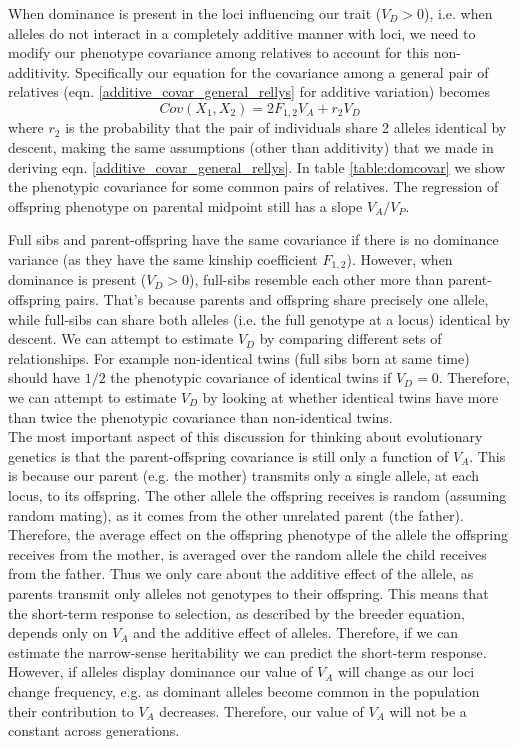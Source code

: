 When dominance is present in the loci influencing our trait ($V_D>0$), i.e. when alleles do not interact
in a completely additive manner with loci, we need to modify our
phenotype covariance among relatives to account for this
non-additivity. Specifically our equation for the covariance among a
general pair of relatives
(eqn. \ref{additive_covar_general_rellys} for additive variation) becomes
\begin{equation}
 Cov(X_1,X_2) = 2 F_{1,2} V_A + r_2 V_D
\end{equation}
where $r_2$ is the probability that the pair of individuals share 2
alleles identical by descent, making the same assumptions (other than additivity) that we made in deriving
eqn. \ref{additive_covar_general_rellys}.  In table
\ref{table:domcovar} we show the phenotypic covariance for some common
pairs of relatives. The regression of offspring phenotype on parental
midpoint still has a slope $V_A/V_P$. 

Full sibs and parent-offspring have the same
covariance if there is no dominance variance (as they have the same
kinship coefficient $F_{1,2}$). However, when dominance
is present ($V_D>0$), full-sibs resemble each other more than
parent-offspring pairs. That's because parents and offspring share
precisely one allele, while full-sibs can share both alleles (i.e. the
full genotype at a locus) identical by descent. We can attempt to
estimate $V_D$ by comparing different sets of relationships. For
example non-identical twins (full sibs born at same time) 
should have $1/2$ the phenotypic covariance of identical twins if
$V_D=0$. Therefore, we can attempt to estimate $V_D$ by looking at
whether identical twins have more than twice the phenotypic covariance
than non-identical twins. \\

The most important aspect of this discussion for thinking about
evolutionary genetics is that the parent-offspring covariance is still
only a function of $V_A$. This is because our parent (e.g. the mother) transmits only a
single allele, at each locus, to its offspring. The other allele the
offspring receives is random (assuming random mating), as it comes
from the other unrelated parent (the father). Therefore, the average
effect on the offspring phenotype of
the allele the offspring receives from the mother, is averaged over
the random allele the child receives from the father. Thus we only
care about the additive effect of the allele, as parents transmit only
alleles not genotypes to their offspring. This means that the short-term response
to selection, as described by the breeder equation, depends only on
$V_A$ and the additive effect of alleles. Therefore, if we can
estimate the narrow-sense heritability we can predict the short-term response.
However, if alleles display dominance our value of $V_A$ will change
as our loci change frequency, e.g. as dominant alleles become common
in the population their contribution to $V_A$ decreases. Therefore,
our value of $V_A$ will not be a constant across generations.


